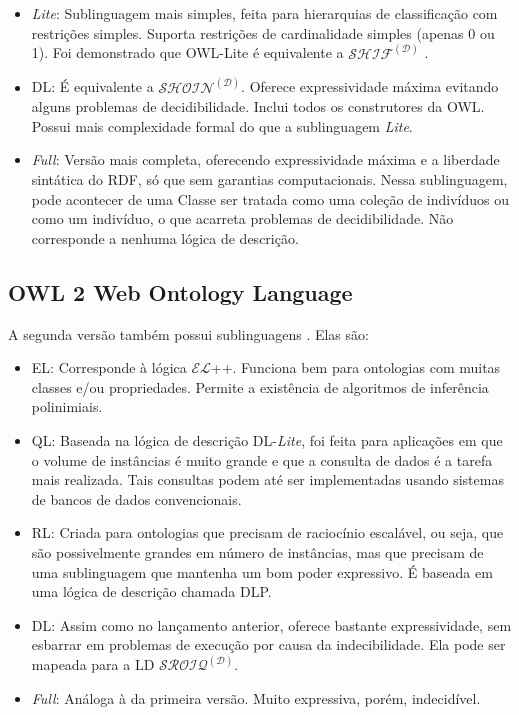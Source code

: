 \begin{itemize}
	\item \textit{Lite}: Sublinguagem mais simples, feita para hierarquias de classificação com restrições simples. Suporta restrições de cardinalidade simples (apenas 0 ou 1).  Foi demonstrado que OWL-Lite é equivalente a $ \mathcal{SHIF^{(D)}} $ \citep{ferramentasGrau}.
	\item DL: É equivalente a $ \mathcal{SHOIN^{(D)}} $. Oferece expressividade máxima evitando alguns problemas de decidibilidade. Inclui todos os construtores da OWL. Possui mais complexidade formal do que a sublinguagem \textit{Lite}.
	\item \textit{Full}: Versão mais completa, oferecendo expressividade máxima e a liberdade sintática do RDF, só que sem garantias computacionais. Nessa sublinguagem, pode acontecer de uma Classe ser tratada como uma coleção de indivíduos ou como um indivíduo, o que acarreta problemas de decidibilidade. Não corresponde a nenhuma lógica de descrição.
\end{itemize}

\subsection{OWL 2 Web Ontology Language}

A segunda versão também possui sublinguagens \citep{ferramentasOWL2}. Elas são:

\begin{itemize}
	\item EL: Corresponde à lógica $ \mathcal{EL} $++. Funciona bem para ontologias com muitas classes e/ou propriedades. Permite a existência de algoritmos de inferência polinimiais.
	\item QL: Baseada na lógica de descrição DL-\textit{Lite}, foi feita para aplicações em que o volume de instâncias é muito grande e que a consulta de dados é a tarefa mais realizada. Tais consultas podem até ser implementadas usando sistemas de bancos de dados convencionais.
	\item RL: Criada para ontologias que precisam de raciocínio escalável, ou seja, que são possivelmente grandes em número de instâncias, mas que precisam de uma sublinguagem que mantenha um bom poder expressivo. É baseada em uma lógica de descrição chamada DLP.
	\item DL: Assim como no lançamento anterior, oferece bastante expressividade, sem esbarrar em problemas de execução por causa da indecibilidade. Ela pode ser mapeada para a LD $ \mathcal{SROIQ^{(D)}} $. 
	\item \textit{Full}: Análoga à da primeira versão. Muito expressiva, porém, indecidível.
\end{itemize}

